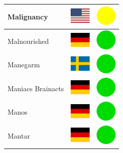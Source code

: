 \documentclass[12pt, a4paper, twoside]{report}
\begin{document}
\begin{center}
\begin{longtable}{|p{5cm}|p{2cm}|p{2cm}|}
 Malignancy                                                 & \includegraphics[width=1cm]{../4x3/us} &   \includegraphics[width=1cm]{../likes/m} \\ \hline
 Malnourished                                               & \includegraphics[width=1cm]{../4x3/de} &   \includegraphics[width=1cm]{../likes/y} \\ \hline
 Manegarm                                                   & \includegraphics[width=1cm]{../4x3/se} &   \includegraphics[width=1cm]{../likes/y} \\ \hline
 Maniacs Brainacts                                          & \includegraphics[width=1cm]{../4x3/de} &   \includegraphics[width=1cm]{../likes/y} \\ \hline
 Manos                                                      & \includegraphics[width=1cm]{../4x3/de} &   \includegraphics[width=1cm]{../likes/y} \\ \hline
 Mantar                                                     & \includegraphics[width=1cm]{../4x3/de} &   \includegraphics[width=1cm]{../likes/y} \\ \hline

\end{longtable}
\end{center}
\end{document}
